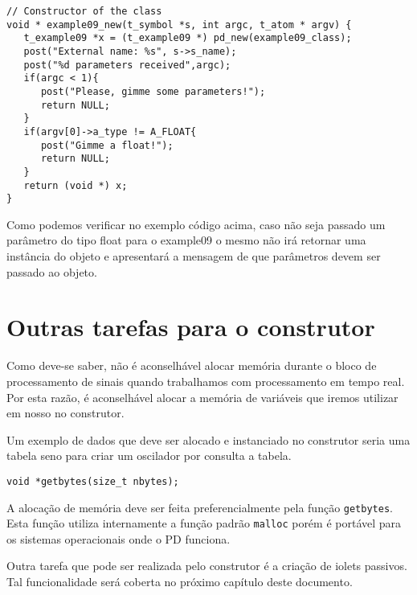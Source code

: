 \begin{lstlisting}[caption=Validando parâmetros na construção de um objeto]
// Constructor of the class
void * example09_new(t_symbol *s, int argc, t_atom * argv) {
   t_example09 *x = (t_example09 *) pd_new(example09_class);
   post("External name: %s", s->s_name);
   post("%d parameters received",argc);
   if(argc < 1){
      post("Please, gimme some parameters!");
      return NULL;
   }
   if(argv[0]->a_type != A_FLOAT{
      post("Gimme a float!");
      return NULL;
   }
   return (void *) x;
}
\end{lstlisting}

Como podemos verificar no exemplo código acima, caso não seja passado um parâmetro
do tipo float para o example09 o mesmo não irá retornar uma instância do objeto
e apresentará a mensagem de que parâmetros devem ser passado ao objeto.

\section{Outras tarefas para o construtor}

Como deve-se saber, não é aconselhável alocar memória durante o bloco de
processamento de sinais quando trabalhamos com processamento em tempo real.
Por esta razão, é aconselhável alocar a memória de variáveis que iremos utilizar
em nosso \external no construtor.

Um exemplo de dados que deve ser alocado e instanciado no construtor seria uma
tabela seno para criar um oscilador por consulta a tabela.

\begin{lstlisting}[caption=Função para a alocação de memória]
void *getbytes(size_t nbytes);
\end{lstlisting}

A alocação de memória deve ser feita preferencialmente pela função \texttt{getbytes}.
Esta função utiliza internamente a função padrão \texttt{malloc} porém é portável
para os sistemas operacionais onde o PD funciona.

Outra tarefa que pode ser realizada pelo construtor é a criação de iolets
passivos.
Tal funcionalidade será coberta no próximo capítulo deste documento.


